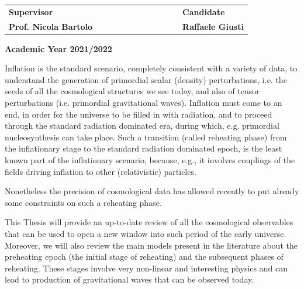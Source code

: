 \documentclass[11pt,a4paper,twoside]{book}
\newenvironment{abstract}{\cleardoublepage\thispagestyle{empty}\null\vfill\begin{center}\bfseries\abstractname\end{center}}{\vfill\null}
\begin{document}
\begin{titlepage}
		\vspace{20mm}
		\begin{spacing}{2}
			\begin{tabular}{ l  c  c c c  cc c c c c  l }
				{\Large{\bf Supervisor}} &&&&&&&&&&& {\Large{\bf Candidate}}\\
				{\Large{\bf Prof. Nicola Bartolo}} &&&&&&&&&&& {\Large{\bf Raffaele Giusti}}\\
			\end{tabular}
		\end{spacing}
		\vspace{15 mm}
		
		\begin{center}
			{\Large{\bf Academic Year 2021/2022}}
		\end{center}
	\end{titlepage}
	\clearpage{\pagestyle{empty}\cleardoublepage}

\begin{abstract}
	Inflation is the standard scenario, completely consistent with a variety of data, to understand the  
	generation of primordial scalar (density) perturbations, i.e.  the seeds of all the cosmological structures we  
	see today, and also of tensor perturbations (i.e. primordial gravitational waves). Inflation must come to an  
	end, in order for the universe to be filled in with radiation, and to proceed  through the standard radiation  
	dominated era, during which, e.g. primordial nucleosynthesis can take place. Such a transition (called  
	reheating phase) from the inflationary stage to the standard radiation dominated epoch, is the least known  
	part of the inflationary scenario, because, e.g., it involves couplings of the fields driving inflation to other  
	(relativistic) particles.  
	
	Nonetheless the precision of cosmological data has allowed recently to put already some constraints on  
	such a reheating phase.  
	
	This Thesis will provide an up-to-date review of all the cosmological observables that can be used to open  
	a new window into such period of the early universe. \\
	Moreover, we will also review the main models present in the literature about the preheating epoch (the initial stage of reheating) and the subsequent phases of reheating. These stages involve very non-linear and interesting physics and can lead to production of gravitational waves that can be observed today.
\end{abstract}
	
\end{document}
